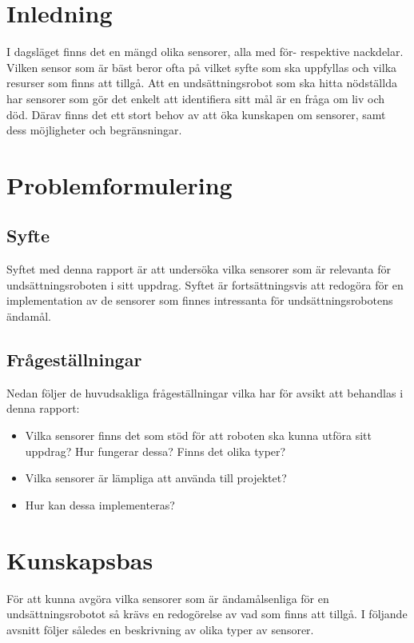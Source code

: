 \documentclass[11pt]{article}
\begin{document}
\begin{flushleft}

\section{Inledning}
I dagsläget finns det en mängd olika sensorer, alla med för- respektive nackdelar. Vilken sensor som är bäst beror ofta på vilket syfte som ska uppfyllas och vilka resurser som finns att tillgå. Att en undsättningsrobot som ska hitta nödställda har sensorer som gör det enkelt att identifiera sitt mål är en fråga om liv och död. Därav finns det ett stort behov av att öka kunskapen om sensorer, samt dess möjligheter och begränsningar.


\section{Problemformulering}

\subsection{Syfte}
Syftet med denna rapport är att undersöka vilka sensorer som är relevanta för undsättningsroboten i sitt uppdrag. Syftet är fortsättningsvis att redogöra för en implementation av de sensorer som finnes intressanta för undsättningsrobotens ändamål.


\subsection{Frågeställningar}
Nedan följer de huvudsakliga frågeställningar vilka har för avsikt att behandlas i denna rapport:



\begin{itemize}

	\item	 Vilka sensorer finns det som stöd för att roboten ska kunna utföra sitt uppdrag? Hur fungerar dessa? Finns det olika typer?
	\item Vilka sensorer är lämpliga att använda till projektet?
	\item Hur kan dessa implementeras? 

\end{itemize}


\pagebreak
\section{Kunskapsbas}
För att kunna avgöra vilka sensorer som är ändamålsenliga för en undsättningsrobotot så krävs en redogörelse av vad som finns att tillgå. I följande avsnitt följer således en beskrivning av olika typer av sensorer.


\end{flushleft}
\end{document}

